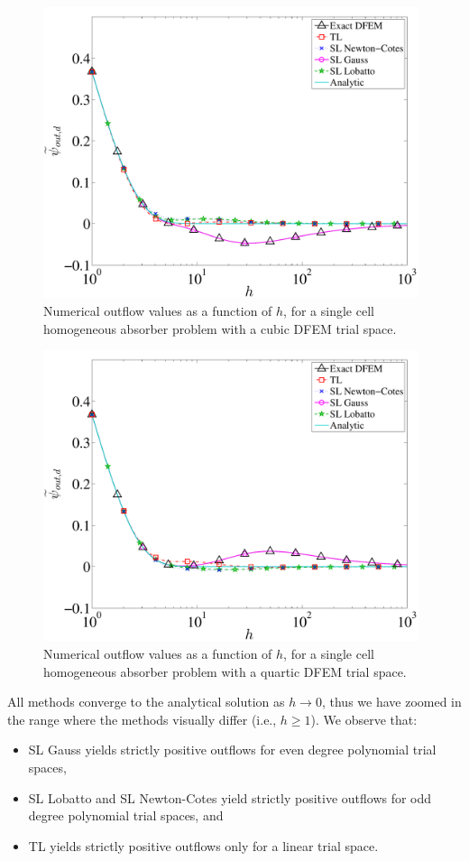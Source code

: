 \begin{figure}[!htp]
\centering
\includegraphics[width=11cm]{chapter2_constant_xs/P3_Outflow_AllMeth-eps-converted-to.pdf}
\caption{Numerical outflow values  as a function of $h$, for a single cell homogeneous absorber problem with a cubic DFEM trial space.}
\label{fig:p3_outflow}
\end{figure}
\begin{figure}[!hbp]
\centering
\includegraphics[width=11cm]{chapter2_constant_xs/P4_Outflow_AllMeth-eps-converted-to.pdf}
\caption{Numerical outflow values  as a function of $h$, for a single cell homogeneous absorber problem with a quartic DFEM trial space.}
\label{fig:p4_outflow}
\end{figure}
All methods converge to the analytical solution as $h\to 0$, thus we have zoomed in the range where the methods  visually differ (i.e., $h \ge 1$). 
We observe that:
\begin{itemize}
\item SL Gauss yields strictly positive outflows for even degree polynomial trial spaces,
\item SL Lobatto and SL Newton-Cotes yield strictly positive outflows for odd degree polynomial trial spaces, and
\item TL yields strictly positive outflows only for a linear trial space.
\end{itemize}
